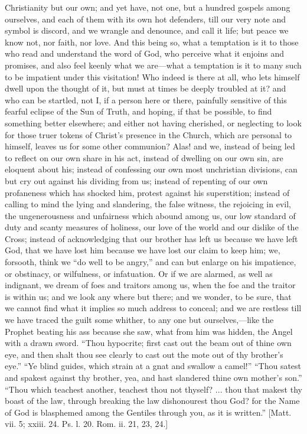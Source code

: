 Christianity but our own; and yet have, not one, but a hundred gospels
among ourselves, and each of them with its own hot defenders, till our
very note and symbol is discord, and we wrangle and denounce, and call
it life; but peace we know not, nor faith, nor love. And this being
so, what a temptation is it to those who read and understand the word
of God, who perceive what it enjoins and promises, and also feel
keenly what we are—what a temptation is it to many such to be
impatient under this visitation! Who indeed is there at all, who lets
himself dwell upon the thought of it, but must at times be deeply
troubled at it? and who can be startled, not I, if a person here or
there, painfully sensitive of this fearful eclipse of the Sun of
Truth, and hoping, if that be possible, to find something better
elsewhere; and either not having cherished, or neglecting to look for
those truer tokens of Christ's presence in the Church, which are
personal to himself, leaves us for some other communion? Alas! and we,
instead of being led to reflect on our own share in his act, instead
of dwelling on our own sin, are eloquent about his; instead of
confessing our own most unchristian divisions, can but cry out against
his dividing from us; instead of repenting of our own profaneness
which has shocked him, protest against his superstition; instead of
calling to mind the lying and slandering, the false witness, the
rejoicing in evil, the ungenerousness and unfairness which abound
among us, our low standard of duty and scanty measures of holiness,
our love of the world and our dislike of the Cross; instead of
acknowledging that our brother has left us because we have left God,
that we have lost him because we have lost our claim to keep him; we,
forsooth, think we ``do well to be angry,'' and can but
enlarge on his impatience, or obstinacy, or wilfulness, or
infatuation. Or if we are alarmed, as well as indignant, we dream of
foes and traitors among us, when the foe and the traitor is within us;
and we look any where but there; and we wonder, to be sure, that we
cannot find what it implies so much address to conceal; and we are
restless till we have traced the guilt some whither, to any one but
ourselves,—like the Prophet beating his ass because she saw, what
from him was hidden, the Angel with a drawn sword. ``Thou
hypocrite; first cast out the beam out of thine own eye, and then
shalt thou see clearly to cast out the mote out of thy brother's
eye.'' ``Ye blind guides, which strain at a gnat and swallow a
camel!'' ``Thou satest and spakest against thy brother, yea,
and hast slandered thine own mother's son.'' ``Thou which
teachest another, teachest thou not thyself? ... thou that makest thy
boast of the law, through breaking the law dishonourest thou God? for
the Name of God is blasphemed among the Gentiles through you, as it is
written.'' [Matt. vii. 5; xxiii. 24. Ps. l. 20. Rom. ii. 21, 23,
24.]

